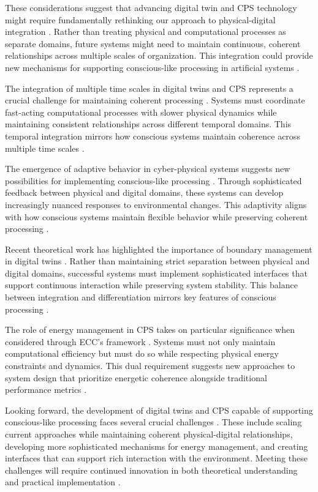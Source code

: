 These considerations suggest that advancing digital twin and CPS technology might require fundamentally rethinking our approach to physical-digital integration \cite{Wang2019}. Rather than treating physical and computational processes as separate domains, future systems might need to maintain continuous, coherent relationships across multiple scales of organization. This integration could provide new mechanisms for supporting conscious-like processing in artificial systems \cite{White2021}.

The integration of multiple time scales in digital twins and CPS represents a crucial challenge for maintaining coherent processing \cite{Fuller2020}. Systems must coordinate fast-acting computational processes with slower physical dynamics while maintaining consistent relationships across different temporal domains. This temporal integration mirrors how conscious systems maintain coherence across multiple time scales \cite{Jones2020}.

The emergence of adaptive behavior in cyber-physical systems suggests new possibilities for implementing conscious-like processing \cite{Madni2019}. Through sophisticated feedback between physical and digital domains, these systems can develop increasingly nuanced responses to environmental changes. This adaptivity aligns with how conscious systems maintain flexible behavior while preserving coherent processing \cite{Minerva2020}.

Recent theoretical work has highlighted the importance of boundary management in digital twins \cite{Lee2018}. Rather than maintaining strict separation between physical and digital domains, successful systems must implement sophisticated interfaces that support continuous interaction while preserving system stability. This balance between integration and differentiation mirrors key features of conscious processing \cite{Rajkumar2018}.

The role of energy management in CPS takes on particular significance when considered through ECC's framework \cite{Grieves2021}. Systems must not only maintain computational efficiency but must do so while respecting physical energy constraints and dynamics. This dual requirement suggests new approaches to system design that prioritize energetic coherence alongside traditional performance metrics \cite{Liu2021}.

Looking forward, the development of digital twins and CPS capable of supporting conscious-like processing faces several crucial challenges \cite{Tao2019}. These include scaling current approaches while maintaining coherent physical-digital relationships, developing more sophisticated mechanisms for energy management, and creating interfaces that can support rich interaction with the environment. Meeting these challenges will require continued innovation in both theoretical understanding and practical implementation \cite{Uhlemann2017}.

